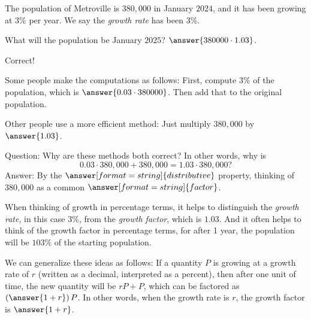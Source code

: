 \documentclass[nooutcomes]{ximera}
\begin{document}
\begin{problem}
The population of Metroville is $380,\!000$ in January $2024$, and it has been growing at $3\%$ per year.  We say the \emph{growth rate} has been $3\%$.  

What will the population be January $2025$?  $\answer{380000\cdot 1.03}$.  
\begin{problem}
Correct!  

Some people make the computations as follows:  First, compute $3\%$ of the population, which is $\answer{0.03\cdot 380000}$.  Then add that to the original population.  

Other people use a more efficient method:  Just multiply $380,\!000$ by $\answer{1.03}$.  

\begin{problem}
Question: Why are these methods both correct?  In other words, why is  
\[
0.03\cdot 380,\!000 + 380,\!000 = 1.03 \cdot 380,\!000?  
\]
Answer: By the $\answer[format=string]{distributive}$ property, thinking of $380,\!000$ as a common $\answer[format=string]{factor}$. 

\begin{problem}
When thinking of growth in percentage terms, it helps to distinguish the \emph{growth rate}, in this case $3\%$, from the 
\emph{growth factor}, which is $1.03$.  And it often helps to think of the growth factor in percentage terms, for after 1 year, 
the population will be $103\%$ of the starting population.  

We can generalize these ideas as follows:  If a quantity $P$ is growing at a growth rate of $r$ (written as a decimal, interpreted as a percent), then after one unit of time, the 
new quantity will be $rP + P$, which can be factored as $\left(\answer{1+r}\right)P$.  In other words, when the growth rate is $r$, the growth factor is $\answer{1+r}$.  

\end{problem}
\end{problem}
\end{problem}
\end{problem}
\end{document}
